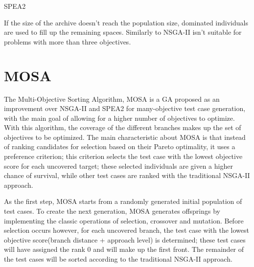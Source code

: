 \begin{algorithm}[H]
    \caption{SPEA2}


    \DontPrintSemicolon   

\end{algorithm}

If the size of the archive doesn't reach the population size, dominated individuals are used to fill up the remaining spaces.
Similarly to NSGA-II isn't suitable for problems with more than three objectives\cite{DBLP:conf/icccsec/LiuZ19}.





\newpage
\section{MOSA}
The Multi-Objective Sorting Algorithm, MOSA \cite{DBLP:conf/icst/PanichellaKT15} is a GA proposed as an improvement over NSGA-II and SPEA2 for many-objective test case generation, with the main goal of allowing for a higher number of objectives to optimize. With this algorithm, the coverage of the different branches makes up the set of objectives to be optimized. The main characteristic about MOSA is that instead of ranking candidates for selection based on their Pareto optimality, it uses a preference criterion; this criterion selects the test case with the lowest objective score for each uncovered target; these selected individuals are given a higher chance of survival, while other test cases are ranked with the traditional NSGA-II approach.


As the first step, MOSA starts from a randomly generated initial population of test cases. 
To create the next generation, MOSA generates offsprings by implementing the classic operations of selection, crossover and mutation. 
Before selection occurs however, for each uncovered branch, the test case with the lowest objective score(branch distance + approach level) is determined; these test cases will have assigned the rank 0 and will make up the first front. The remainder of the test cases will be sorted according to the traditional NSGA-II approach.

